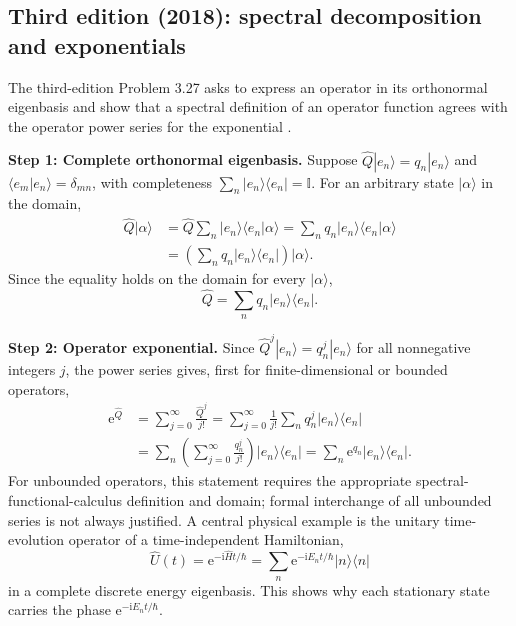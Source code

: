 \documentclass[11pt,a4paper]{article}
\newcommand{\iu}{\mathrm{i}}
\newcommand{\ee}{\mathrm{e}}
\newcommand{\id}{\mathbb I}
\newcommand{\bra}[1]{\langle #1|}
\newcommand{\ket}[1]{|#1\rangle}
\newcommand{\braket}[2]{\langle #1|#2\rangle}
\begin{document}
\subsection{Third edition (2018): spectral decomposition and exponentials}
The third-edition Problem 3.27 asks to express an operator in its orthonormal eigenbasis and show that a spectral definition of an operator function agrees with the operator power series for the exponential \cite{griffiths3}.

\textbf{Step 1: Complete orthonormal eigenbasis.} Suppose $\hat Q\ket{e_n}=q_n\ket{e_n}$ and $\langle e_m|e_n\rangle=\delta_{mn}$, with completeness $\sum_n\ket{e_n}\bra{e_n}=\id$. For an arbitrary state $\ket\alpha$ in the domain,
\begin{align}
\hat Q\ket\alpha
&=\hat Q\sum_n\ket{e_n}\braket{e_n}{\alpha}
=\sum_nq_n\ket{e_n}\braket{e_n}{\alpha}\\
&=\left(\sum_nq_n\ket{e_n}\bra{e_n}\right)\ket\alpha.
\end{align}
Since the equality holds on the domain for every $\ket\alpha$,
\begin{equation}\boxed{\hat Q=\sum_nq_n\ket{e_n}\bra{e_n}.}\end{equation}

\textbf{Step 2: Operator exponential.} Since $\hat Q^j\ket{e_n}=q_n^j\ket{e_n}$ for all nonnegative integers $j$, the power series gives, first for finite-dimensional or bounded operators,
\begin{align}
\ee^{\hat Q}&=\sum_{j=0}^{\infty}\frac{\hat Q^j}{j!}
=\sum_{j=0}^{\infty}\frac1{j!}\sum_nq_n^j\ket{e_n}\bra{e_n}\\
&=\sum_n\left(\sum_{j=0}^{\infty}\frac{q_n^j}{j!}\right)\ket{e_n}\bra{e_n}
=\boxed{\sum_n\ee^{q_n}\ket{e_n}\bra{e_n}}.
\end{align}
For unbounded operators, this statement requires the appropriate spectral-functional-calculus definition and domain; formal interchange of all unbounded series is not always justified. A central physical example is the unitary time-evolution operator of a time-independent Hamiltonian,
\begin{equation}
\boxed{\hat U(t)=\ee^{-\iu\hat Ht/\hbar}=\sum_n\ee^{-\iu E_nt/\hbar}\ket n\bra n}
\end{equation}
in a complete discrete energy eigenbasis. This shows why each stationary state carries the phase $\ee^{-\iu E_nt/\hbar}$.
\end{document}
